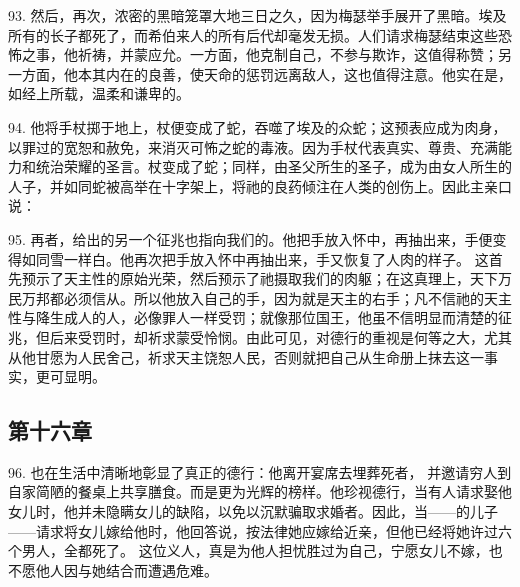 93. 然后，再次，浓密的黑暗笼罩大地三日之久，因为梅瑟举手展开了黑暗。埃及所有的长子都死了，而希伯来人的所有后代却毫发无损。人们请求梅瑟结束这些恐怖之事，他祈祷，并蒙应允。一方面，他克制自己，不参与欺诈，这值得称赞；另一方面，他本其内在的良善，使天命的惩罚远离敌人，这也值得注意。他实在是，如经上所载，温柔和谦卑的。\par

94. 他将手杖掷于地上，杖便变成了蛇，吞噬了埃及的众蛇；这预表应成为肉身，以罪过的宽恕和赦免，来消灭可怖之蛇的毒液。因为手杖代表真实、尊贵、充满能力和统治荣耀的圣言。杖变成了蛇；同样，由圣父所生的圣子，成为由女人所生的人子，并如同蛇被高举在十字架上，将祂的良药倾注在人类的创伤上。因此主亲口说：\par

95. 再者，给出的另一个征兆也指向我们的。他把手放入怀中，再抽出来，手便变得如同雪一样白。他再次把手放入怀中再抽出来，手又恢复了人肉的样子。 这首先预示了天主性的原始光荣，然后预示了祂摄取我们的肉躯；在这真理上，天下万民万邦都必须信从。所以他放入自己的手，因为就是天主的右手；凡不信祂的天主性与降生成人的人，必像罪人一样受罚；就像那位国王，他虽不信明显而清楚的征兆，但后来受罚时，却祈求蒙受怜悯。由此可见，对德行的重视是何等之大，尤其从他甘愿为人民舍己，祈求天主饶恕人民，否则就把自己从生命册上抹去这一事实，更可显明。\par


\subsection{第十六章}

\par

96. 也在生活中清晰地彰显了真正的德行：他离开宴席去埋葬死者， 并邀请穷人到自家简陋的餐桌上共享膳食。而是更为光辉的榜样。他珍视德行，当有人请求娶他女儿时，他并未隐瞒女儿的缺陷，以免以沉默骗取求婚者。因此，当——的儿子——请求将女儿嫁给他时，他回答说，按法律她应嫁给近亲，但他已经将她许过六个男人，全都死了。 这位义人，真是为他人担忧胜过为自己，宁愿女儿不嫁，也不愿他人因与她结合而遭遇危难。\par

